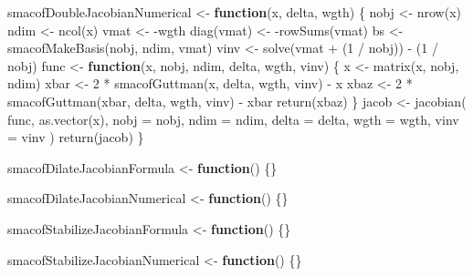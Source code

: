 \documentclass[
  12pt,
  letterpaper,
  DIV=11,
  numbers=noendperiod]{scrartcl}
\newenvironment{Shaded}{\begin{snugshade}}{\end{snugshade}}
\newcommand{\AttributeTok}[1]{\textcolor[rgb]{0.40,0.45,0.13}{#1}}
\newcommand{\ControlFlowTok}[1]{\textcolor[rgb]{0.00,0.23,0.31}{\textbf{#1}}}
\newcommand{\DecValTok}[1]{\textcolor[rgb]{0.68,0.00,0.00}{#1}}
\newcommand{\FunctionTok}[1]{\textcolor[rgb]{0.28,0.35,0.67}{#1}}
\newcommand{\NormalTok}[1]{\textcolor[rgb]{0.00,0.23,0.31}{#1}}
\newcommand{\OtherTok}[1]{\textcolor[rgb]{0.00,0.23,0.31}{#1}}
\newcommand{\SpecialCharTok}[1]{\textcolor[rgb]{0.37,0.37,0.37}{#1}}
\begin{document}
\begin{Shaded}
\begin{Highlighting}[]
\NormalTok{smacofDoubleJacobianNumerical }\OtherTok{\textless{}{-}} \ControlFlowTok{function}\NormalTok{(x, delta, wgth) \{}
\NormalTok{  nobj }\OtherTok{\textless{}{-}} \FunctionTok{nrow}\NormalTok{(x)}
\NormalTok{  ndim }\OtherTok{\textless{}{-}} \FunctionTok{ncol}\NormalTok{(x)}
\NormalTok{  vmat }\OtherTok{\textless{}{-}} \SpecialCharTok{{-}}\NormalTok{wgth}
  \FunctionTok{diag}\NormalTok{(vmat) }\OtherTok{\textless{}{-}} \SpecialCharTok{{-}}\FunctionTok{rowSums}\NormalTok{(vmat)}
\NormalTok{  bs }\OtherTok{\textless{}{-}} \FunctionTok{smacofMakeBasis}\NormalTok{(nobj, ndim, vmat)}
\NormalTok{  vinv }\OtherTok{\textless{}{-}} \FunctionTok{solve}\NormalTok{(vmat }\SpecialCharTok{+}\NormalTok{ (}\DecValTok{1} \SpecialCharTok{/}\NormalTok{ nobj)) }\SpecialCharTok{{-}}\NormalTok{ (}\DecValTok{1} \SpecialCharTok{/}\NormalTok{ nobj)}
\NormalTok{  func }\OtherTok{\textless{}{-}} \ControlFlowTok{function}\NormalTok{(x, nobj, ndim, delta, wgth, vinv) \{}
\NormalTok{    x }\OtherTok{\textless{}{-}} \FunctionTok{matrix}\NormalTok{(x, nobj, ndim)}
\NormalTok{    xbar }\OtherTok{\textless{}{-}} \DecValTok{2} \SpecialCharTok{*} \FunctionTok{smacofGuttman}\NormalTok{(x, delta, wgth, vinv) }\SpecialCharTok{{-}}\NormalTok{ x}
\NormalTok{    xbaz }\OtherTok{\textless{}{-}} \DecValTok{2} \SpecialCharTok{*} \FunctionTok{smacofGuttman}\NormalTok{(xbar, delta, wgth, vinv) }\SpecialCharTok{{-}}\NormalTok{ xbar}
    \FunctionTok{return}\NormalTok{(xbaz)}
\NormalTok{  \}}
\NormalTok{  jacob }\OtherTok{\textless{}{-}} \FunctionTok{jacobian}\NormalTok{(}
\NormalTok{    func,}
    \FunctionTok{as.vector}\NormalTok{(x),}
    \AttributeTok{nobj =}\NormalTok{ nobj,}
    \AttributeTok{ndim =}\NormalTok{ ndim,}
    \AttributeTok{delta =}\NormalTok{ delta,}
    \AttributeTok{wgth =}\NormalTok{ wgth,}
    \AttributeTok{vinv =}\NormalTok{ vinv}
\NormalTok{  )}
  \FunctionTok{return}\NormalTok{(jacob)}
\NormalTok{\}}

\NormalTok{smacofDilateJacobianFormula }\OtherTok{\textless{}{-}} \ControlFlowTok{function}\NormalTok{() \{\}}

\NormalTok{smacofDilateJacobianNumerical }\OtherTok{\textless{}{-}} \ControlFlowTok{function}\NormalTok{() \{\}}


\NormalTok{smacofStabilizeJacobianFormula }\OtherTok{\textless{}{-}} \ControlFlowTok{function}\NormalTok{() \{\}}

\NormalTok{smacofStabilizeJacobianNumerical }\OtherTok{\textless{}{-}} \ControlFlowTok{function}\NormalTok{() \{\}}
\end{Highlighting}
\end{Shaded}
\end{document}
